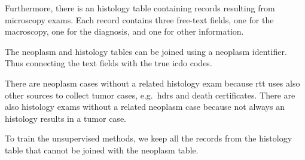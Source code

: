Furthermore, there is an histology table containing records resulting
from microscopy exams. Each record contains three free-text
fields, one for the macroscopy, one for the diagnosis, and one for
other information.

The neoplasm and histology tables can be joined using a
neoplasm identifier. Thus connecting the text
fields with the true \ac{icdo} codes.


There are neoplasm cases
without a related histology exam because \ac{rtt} uses also other
sources to collect tumor cases, e.g.\ \acp{hdr} and death
certificates. There are also histology exams without a related
neoplasm 
case because not always an histology results in a tumor case.

To train the unsupervised methods, we keep all the records from the
histology table that cannot be joined with 
the neoplasm table.

